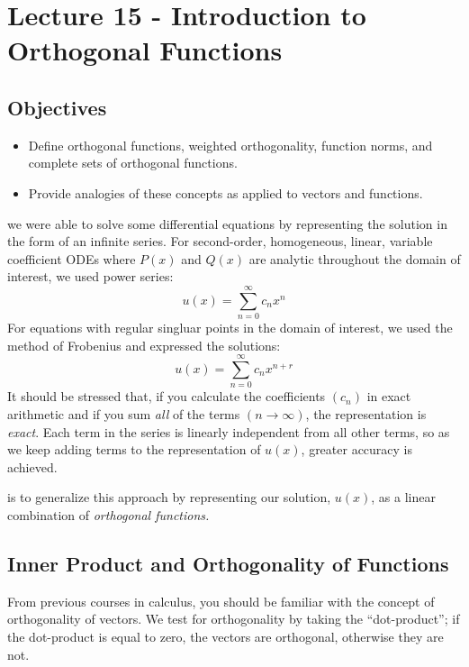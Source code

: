 \chapter{Lecture 15 - Introduction to Orthogonal Functions}
\label{ch:lec15}
\section{Objectives}
\begin{itemize}
\item Define orthogonal functions, weighted orthogonality, function norms, and complete sets of orthogonal functions.
\item Provide analogies of these concepts as applied to vectors and functions.
\end{itemize}

 we were able to solve some differential equations by representing the solution  in the form of an infinite series.  For second-order, homogeneous, linear, variable coefficient ODEs where $P(x)$ and $Q(x)$ are analytic throughout the domain of interest, we used power series:
\begin{equation*}
u(x) = \sum\limits_{n=0}^{\infty}c_nx^n
\end{equation*}
For equations with regular singluar points in the domain of interest, we used the method of Frobenius and expressed the solutions:
\begin{equation*}
u(x) = \sum\limits_{n=0}^{\infty}c_nx^{n+r}
\end{equation*}
It should be stressed that, if you calculate the coefficients $(c_n)$ in exact arithmetic and if you sum \emph{all} of the terms $(n\to \infty)$, the representation is \emph{exact}.  Each term in the series is linearly independent from all other terms, so as we keep adding terms to the representation of $u(x)$, greater accuracy is achieved.  

 is to generalize this approach by representing our solution, $u(x)$, as a linear combination of \emph{orthogonal functions.}

\section{Inner Product and Orthogonality of Functions}
From previous courses in calculus, you should be familiar with the concept of orthogonality of vectors.  We test for orthogonality by taking the ``dot-product''; if the dot-product is equal to zero, the vectors are orthogonal, otherwise they are not.

